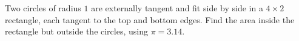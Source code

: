 Two circles of radius $1$ are externally tangent and fit side by side in a $4\times2$ rectangle, each tangent to the top and bottom edges. Find the area inside the rectangle but outside the circles, using $\pi=3.14$.
